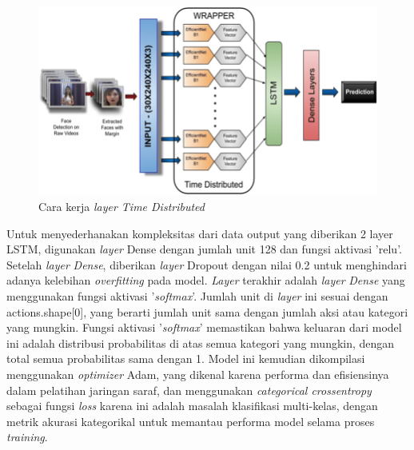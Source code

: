 \begin{figure}[H]
  \centering

  \includegraphics[scale=0.45]{gambar/layer-timedistributed.png}

  \caption{Cara kerja \emph{layer Time Distributed} \parencite{Singh2020}}
  \label{fig:layerTimeDistributed}
\end{figure}

Untuk menyederhanakan kompleksitas dari data output yang diberikan 2 layer LSTM, digunakan \emph{layer} Dense dengan jumlah unit 128 dan fungsi aktivasi 'relu'. Setelah \emph{layer} \textit{Dense}, diberikan \emph{layer} Dropout dengan nilai 0.2 untuk menghindari adanya kelebihan \emph{overfitting} pada model. \emph{Layer} terakhir adalah \emph{layer} \textit{Dense} yang menggunakan fungsi aktivasi '\textit{softmax}'. Jumlah unit di \emph{layer} ini sesuai dengan actions.shape[0], yang berarti jumlah unit sama dengan jumlah aksi atau kategori yang mungkin. Fungsi aktivasi '\textit{softmax}' memastikan bahwa keluaran dari model ini adalah distribusi probabilitas di atas semua kategori yang mungkin, dengan total semua probabilitas sama dengan 1. Model ini kemudian dikompilasi menggunakan \emph{optimizer} Adam, yang dikenal karena performa dan efisiensinya dalam pelatihan jaringan saraf, dan menggunakan \textit{categorical crossentropy} sebagai fungsi \textit{loss} karena ini adalah masalah klasifikasi multi-kelas, dengan metrik akurasi kategorikal untuk memantau performa model selama proses \textit{training}. 

